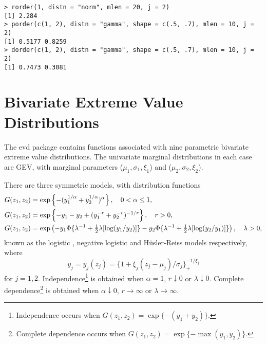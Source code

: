 \documentclass[11pt,a4paper]{article}
\begin{document}
\begin{verbatim}
> rorder(1, distn = "norm", mlen = 20, j = 2)
[1] 2.284
> porder(c(1, 2), distn = "gamma", shape = c(.5, .7), mlen = 10, j = 2)
[1] 0.5177 0.8259
> dorder(c(1, 2), distn = "gamma", shape = c(.5, .7), mlen = 10, j = 2)
[1] 0.7473 0.3081
\end{verbatim}

\section{Bivariate Extreme Value Distributions}
\setcounter{footnote}{0}
\label{biv}

The evd package contains functions associated with nine parametric bivariate extreme value distributions.
The univariate marginal distributions in each case are GEV, with marginal parameters ($\mu_1,\sigma_1,\xi_1$) and ($\mu_2,\sigma_2,\xi_2$).

There are three symmetric models, with distribution functions 
\begin{align}
&G(z_1,z_2) = \exp\left\{- (y_1^{1/\alpha}+y_2^{1/\alpha})^\alpha \right\}, \quad 0<\alpha\leq1, \label{log} \\
&G(z_1,z_2) = \exp\left\{ - y_1 - y_2 + (y_1^{-r}+y_2^{-r})^{-1/r} \right\}, \quad r>0, \label{neglog} \\
&G(z_1,z_2) = \exp\left( - y_1\Phi\{\lambda^{-1}+{\textstyle\frac{1}{2}}\lambda[\log(y_1/y_2)]\} - y_2\Phi\{\lambda^{-1}+{\textstyle\frac{1}{2}}\lambda[\log(y_2/y_1)]\}\right), \quad \lambda>0, \notag
\end{align}
known as the logistic \citep{gumb60b}, negative logistic \citep{gala75} and H\"{u}sler-Reiss \citep{huslreis89} models respectively, where
\begin{equation}
y_j = y_j(z_j) = \{1+\xi_j(z_j-\mu_j)/\sigma_j\}_{+}^{-1/\xi_j}
\label{mtrans}
\end{equation}
for $j=1,2$.
Independence\footnote{
Independence occurs when $G(z_1,z_2) = \exp\{-(y_1+y_2)\}$.} 
is obtained when $\alpha=1$, $r\downarrow0$ or $\lambda\downarrow0$.
Complete dependence\footnote{
Complete dependence occurs when $G(z_1,z_2) = \exp\{-\max(y_1,y_2)\}$.} 
is obtained when $\alpha\downarrow0$, $r\rightarrow\infty$ or $\lambda\rightarrow\infty$.
\end{document}
